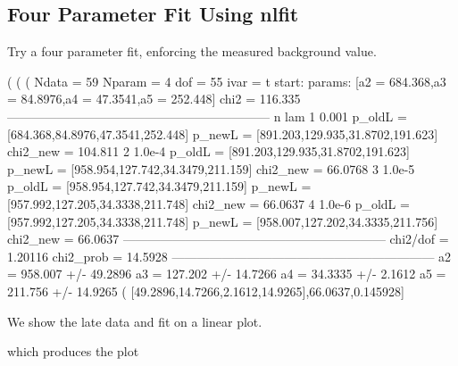 \documentclass[12pt]{article}
\begin{document}
\subsection{Four Parameter Fit Using \textbf{nlfit}}
\noindent Try a four parameter fit, enforcing the measured background
  value.
\begin{myVerbatim}
(%
(%
(%
 Ndata =  59 
 Nparam =  4 
 dof =  55 
 ivar =  t 
start:   params:    [a2 = 684.368,a3 = 84.8976,a4 = 47.3541,a5 = 252.448] 
                          chi2 =  116.335 
--------------------------------------------------------------- 
  n     lam 
  1    0.001 
              p_oldL =  [684.368,84.8976,47.3541,252.448] 
              p_newL =  [891.203,129.935,31.8702,191.623]    chi2_new =  
                       104.811 
  2    1.0e-4 
              p_oldL =  [891.203,129.935,31.8702,191.623] 
              p_newL =  [958.954,127.742,34.3479,211.159]    chi2_new =  
                       66.0768 
  3    1.0e-5 
              p_oldL =  [958.954,127.742,34.3479,211.159] 
              p_newL =  [957.992,127.205,34.3338,211.748]    chi2_new =  
                       66.0637 
  4    1.0e-6 
              p_oldL =  [957.992,127.205,34.3338,211.748] 
              p_newL =  [958.007,127.202,34.3335,211.756]    chi2_new =  
                       66.0637 
--------------------------------------------------------------- 
 chi2/dof =  1.20116 
 chi2_prob =  14.5928 %
--------------------------------------------------------------- 
a2 =  958.007  +/-  49.2896 
a3 =  127.202  +/-  14.7266 
a4 =  34.3335  +/-  2.1612 
a5 =  211.756  +/-  14.9265 
(%
        [49.2896,14.7266,2.1612,14.9265],66.0637,0.145928]
\end{myVerbatim}
\newpage
\noindent We show the late data and fit on a linear plot.
\noindent which produces the plot
\end{document}
